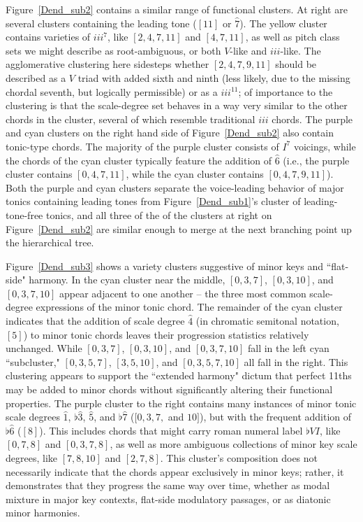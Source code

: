 Figure~\ref{Dend_sub2} contains a similar range of functional clusters.  At right are several clusters containing the leading tone ($[11]$ or $\hat{7}$).  The yellow cluster contains varieties of $iii^7$, like $[2,4,7,11]$ and $[4,7,11]$, as well as pitch class sets we might describe as root-ambiguous, or both $V$-like and $iii$-like.  The agglomerative clustering here sidesteps whether $[2,4,7,9,11]$ should be described as a $V$ triad with added sixth and ninth (less likely, due to the missing chordal seventh, but logically permissible) or as a $iii^{11}$; of importance to the clustering is that the scale-degree set behaves in a way very similar to the other chords in the cluster, several of which resemble traditional $iii$ chords.  The purple and cyan clusters on the right hand side of Figure~\ref{Dend_sub2} also contain tonic-type chords.  The majority of the purple cluster consists of $I^7$ voicings, while the chords of the cyan cluster typically feature the addition of $\hat{6}$ (i.e., the purple cluster contains $[0,4,7,11]$, while the cyan cluster contains $[0,4,7,9,11]$).  Both the purple and cyan clusters separate the voice-leading behavior of major tonics containing leading tones from Figure~\ref{Dend_sub1}'s cluster of leading-tone-free tonics, and all three of the of the clusters at right on Figure~\ref{Dend_sub2} are similar enough to merge at the next branching point up the hierarchical tree.

Figure~\ref{Dend_sub3} shows a variety clusters suggestive of minor keys and ``flat-side" harmony.  In the cyan cluster near the middle, $[0,3,7]$, $[0,3,10]$, and $[0,3,7,10]$ appear adjacent to one another -- the three most common scale-degree expressions of the minor tonic chord.  The remainder of the cyan cluster indicates that the addition of scale degree $\hat{4}$ (in chromatic semitonal notation, $[5]$) to minor tonic chords leaves their progression statistics relatively unchanged.  While $[0,3,7]$, $[0,3,10]$, and $[0,3,7,10]$ fall in the left cyan ``subcluster," $[0,3,5,7]$, $[3,5,10]$, and $[0,3,5,7,10]$ all fall in the right.  This clustering appears to support the ``extended harmony" dictum that perfect 11ths may be added to minor chords without significantly altering their functional properties.  The purple cluster to the right contains many instances of minor tonic scale degrees $\hat{1}$, $\flat\hat{3}$, $\hat{5}$, and $\flat\hat{7}$ ($[0,3,7,$ and $10]$), but with the frequent addition of $\flat\hat{6}$ ($[8]$).  This includes chords that might carry roman numeral label $\flat VI$, like $[0,7,8]$ and $[0,3,7,8]$, as well as more ambiguous collections of minor key scale degrees, like $[7,8,10]$ and $[2,7,8]$.  This cluster's composition does not necessarily indicate that the chords appear exclusively in minor keys; rather, it demonstrates that they progress the same way over time, whether as modal mixture in major key contexts, flat-side modulatory passages, or as diatonic minor harmonies.

